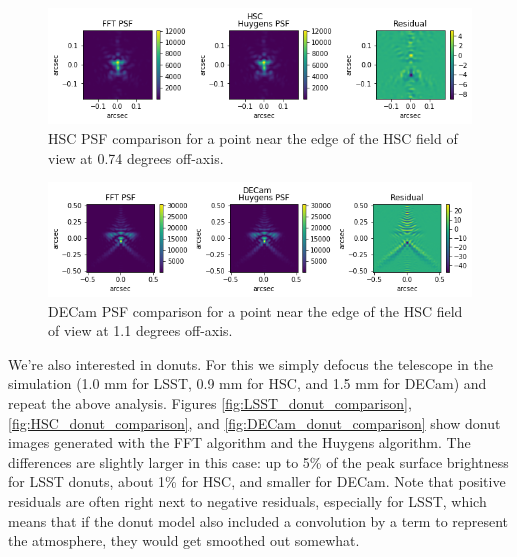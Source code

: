 \documentclass{article}
\begin{document}
\begin{figure}
    \includegraphics[scale=0.7]{HSC_PSF_comparison.png}

    \caption{HSC PSF comparison for a point near the edge of the HSC field of view at 0.74 degrees
    off-axis.}

    \label{fig:HSC_psf_comparison}
\end{figure}

\begin{figure}
    \includegraphics[scale=0.7]{DECam_PSF_comparison.png}

    \caption{DECam PSF comparison for a point near the edge of the HSC field of view at 1.1 degrees
    off-axis.}

    \label{fig:DECam_psf_comparison}
\end{figure}

We're also interested in donuts.  For this we simply defocus the telescope in the simulation (1.0 mm
for LSST, 0.9 mm for HSC, and 1.5 mm for DECam) and repeat the above analysis.  Figures
\ref{fig:LSST_donut_comparison}, \ref{fig:HSC_donut_comparison}, and
\ref{fig:DECam_donut_comparison} show donut images generated with the FFT algorithm and the Huygens
algorithm.  The differences are slightly larger in this case: up to 5\% of the peak surface
brightness for LSST donuts, about 1\% for HSC, and smaller for DECam.  Note that positive residuals
are often right next to negative residuals, especially for LSST, which means that if the donut model
also included a convolution by a term to represent the atmosphere, they would get smoothed out
somewhat.
\end{document}
